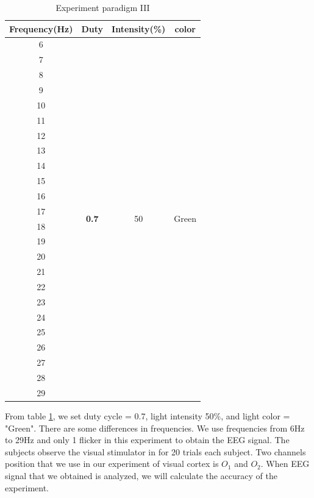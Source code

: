 \begin{table}[ht]
\centering
\begin{tabular}{| c | c | c | c |}
	\hline 
    \textbf{Frequency(Hz)}&\textbf{Duty}&\textbf{Intensity(\%)}&\textbf{color}\\
    \hline
    6&\multirow{24}{*}{\textbf{0.7}}&
    \multirow{24}{*}{50}&
    \multirow{24}{*}{Green}\\
    \cline{1-1}
    7&&&\\\cline{1-1}
    8&&&\\ \cline{1-1}
    9&&&\\ \cline{1-1}
    10&&&\\ \cline{1-1}
    11&&&\\ \cline{1-1}
    12&&&\\ \cline{1-1}
    13&&&\\\cline{1-1}
    14&&&\\ \cline{1-1}
    15&&&\\ \cline{1-1}
    16&&&\\ \cline{1-1}
    17&&&\\ \cline{1-1}
    18&&&\\ \cline{1-1}
    19&&&\\ \cline{1-1}
    20&&&\\ \cline{1-1}
    21&&&\\ \cline{1-1}
    22&&&\\ \cline{1-1}
    23&&&\\ \cline{1-1}
    24&&&\\ \cline{1-1}
    25&&&\\ \cline{1-1}
    26&&&\\ \cline{1-1}
    27&&&\\ \cline{1-1}
    28&&&\\ \cline{1-1}
    29&&&\\ 
    \hline
	\end{tabular}       
\caption{Experiment paradigm III}
\label{table:paradigm_3}
\end{table}

From table \ref{table:paradigm_3}, we set duty cycle = 0.7, light intensity 50\%, and light color = "Green". There are some differences in frequencies. We use frequencies from 6Hz to 29Hz and only 1 flicker in this experiment to obtain the EEG signal. The subjects observe the visual stimulator in for 20 trials each subject. Two channels position that we use in our experiment of visual cortex is $O_1$ and $O_2$. When EEG signal that we obtained is analyzed, we will calculate the accuracy of the experiment.


